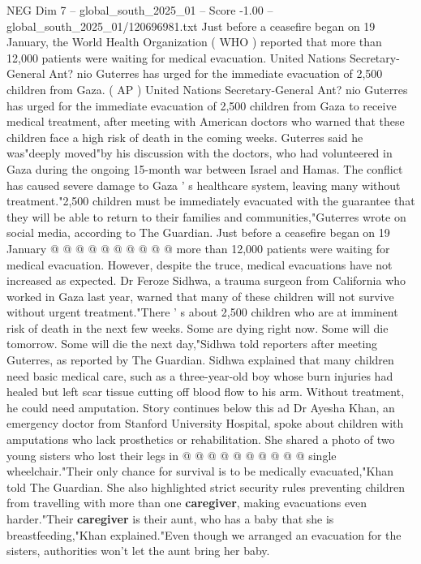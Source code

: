 \begin{textsample}{NEG Dim 7 – global\_south\_2025\_01 – Score -1.00 – global\_south\_2025\_01/120696981.txt}  \label{ex:f7_neg_118}
Just before a ceasefire began on 19 January, the World Health Organization ( WHO ) reported that more than 12,000 patients were waiting for medical evacuation.
United Nations Secretary-General Ant? nio Guterres has urged for the immediate evacuation of 2,500 children from Gaza. ( AP ) United Nations Secretary-General Ant? nio Guterres has urged for the immediate evacuation of 2,500 children from Gaza to receive medical treatment, after meeting with American doctors who warned that these children face a high risk of death in the coming weeks.
Guterres said he was"deeply moved"by his discussion with the doctors, who had volunteered in Gaza during the ongoing 15-month war between Israel and Hamas.
The conflict has caused severe damage to Gaza ' s healthcare system, leaving many without treatment."2,500 children must be immediately evacuated with the guarantee that they will be able to return to their families and communities,"Guterres wrote on social media, according to The Guardian.
Just before a ceasefire began on 19 January @ @ @ @ @ @ @ @ @ @ more than 12,000 patients were waiting for medical evacuation.
However, despite the truce, medical evacuations have not increased as expected.
Dr Feroze Sidhwa, a trauma surgeon from California who worked in Gaza last year, warned that many of these children will not survive without urgent treatment."There ' s about 2,500 children who are at imminent risk of death in the next few weeks.
Some are dying right now.
Some will die tomorrow.
Some will die the next day,"Sidhwa told reporters after meeting Guterres, as reported by The Guardian.
Sidhwa explained that many children need basic medical care, such as a three-year-old boy whose burn injuries had healed but left scar tissue cutting off blood flow to his arm.
Without treatment, he could need amputation.
Story continues below this ad Dr Ayesha Khan, an emergency doctor from Stanford University Hospital, spoke about children with amputations who lack prosthetics or rehabilitation.
She shared a photo of two young sisters who lost their legs in @ @ @ @ @ @ @ @ @ @ single wheelchair."Their only chance for survival is to be medically evacuated,"Khan told The Guardian.
She also highlighted strict security rules preventing children from travelling with more than one \textbf{caregiver}, making evacuations even harder."Their \textbf{caregiver} is their aunt, who has a baby that she is breastfeeding,"Khan explained."Even though we arranged an evacuation for the sisters, authorities won't let the aunt bring her baby.

\end{textsample}
